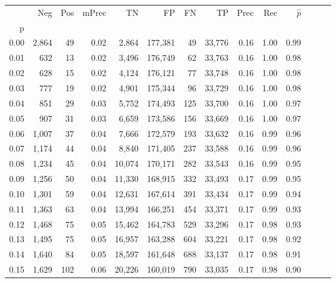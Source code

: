\begin{tabular}{rrrrrrrrrrrrrr}
\toprule
{} &    Neg &  Pos & mPrec &       TN &       FP &      FN &      TP &  Prec &   Rec & $\hat{p}$ \\
p    &        &      &       &          &          &         &         &       &       &           \\
\midrule
0.00 &  2,864 &   49 &  0.02 &    2,864 &  177,381 &      49 &  33,776 &  0.16 &  1.00 &      0.99 \\
0.01 &    632 &   13 &  0.02 &    3,496 &  176,749 &      62 &  33,763 &  0.16 &  1.00 &      0.98 \\
0.02 &    628 &   15 &  0.02 &    4,124 &  176,121 &      77 &  33,748 &  0.16 &  1.00 &      0.98 \\
0.03 &    777 &   19 &  0.02 &    4,901 &  175,344 &      96 &  33,729 &  0.16 &  1.00 &      0.98 \\
0.04 &    851 &   29 &  0.03 &    5,752 &  174,493 &     125 &  33,700 &  0.16 &  1.00 &      0.97 \\
0.05 &    907 &   31 &  0.03 &    6,659 &  173,586 &     156 &  33,669 &  0.16 &  1.00 &      0.97 \\
0.06 &  1,007 &   37 &  0.04 &    7,666 &  172,579 &     193 &  33,632 &  0.16 &  0.99 &      0.96 \\
0.07 &  1,174 &   44 &  0.04 &    8,840 &  171,405 &     237 &  33,588 &  0.16 &  0.99 &      0.96 \\
0.08 &  1,234 &   45 &  0.04 &   10,074 &  170,171 &     282 &  33,543 &  0.16 &  0.99 &      0.95 \\
0.09 &  1,256 &   50 &  0.04 &   11,330 &  168,915 &     332 &  33,493 &  0.17 &  0.99 &      0.95 \\
0.10 &  1,301 &   59 &  0.04 &   12,631 &  167,614 &     391 &  33,434 &  0.17 &  0.99 &      0.94 \\
0.11 &  1,363 &   63 &  0.04 &   13,994 &  166,251 &     454 &  33,371 &  0.17 &  0.99 &      0.93 \\
0.12 &  1,468 &   75 &  0.05 &   15,462 &  164,783 &     529 &  33,296 &  0.17 &  0.98 &      0.93 \\
0.13 &  1,495 &   75 &  0.05 &   16,957 &  163,288 &     604 &  33,221 &  0.17 &  0.98 &      0.92 \\
0.14 &  1,640 &   84 &  0.05 &   18,597 &  161,648 &     688 &  33,137 &  0.17 &  0.98 &      0.91 \\
0.15 &  1,629 &  102 &  0.06 &   20,226 &  160,019 &     790 &  33,035 &  0.17 &  0.98 &      0.90 \\

\end{tabular}
